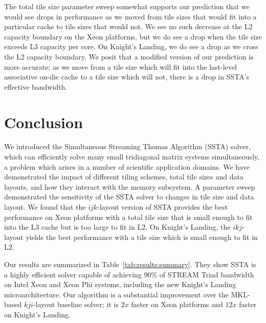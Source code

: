 \documentclass[10pt, conference, compsocconf]{IEEEtran}
\newcommand{\textapprox}{\texttildelow}
\begin{document}
The total tile size parameter sweep somewhat supports our prediction that we
  would see drops in performance as we moved from tile sizes that would
  fit into a particular cache to tile sizes that would not.
We see no such decrease at the L2 capacity boundary on the Xeon platforms, but
  we do see a drop when the tile size exceeds L3 capacity per core.
On Knight's Landing, we do see a drop as we cross the L2 capacity boundary.
We posit that a modified version of our prediction is more accurate; as we move
  from a tile size which will fit into the last-level associative on-die cache
  to a tile size which will not, there is a drop in SSTA's effective bandwidth.

\section{Conclusion}
\label{sec:conclusion}


We introduced the Simultaneous Streaming Thomas Algorithm (SSTA) solver, which
  can efficiently solve many small tridiagonal matrix systems simultaneously, a
  problem which arises in a number of scientific application domains.
We have demonstrated the impact of different tiling schemes, total tile sizes
  and data layouts, and how they interact with the memory subsystem.
A parameter sweep demonstrated the sensitivity of the SSTA solver to changes in
  tile size and data layout.
We found that the \(ijk\)-layout version of SSTA provides the best performance
  on Xeon platforms with a total tile size that is small enough to fit into 
  the L3 cache but is too large to fit in L2.
On Knight's Landing, the \(ikj\)-layout yields the best performance with a
  tile size which is small enough to fit in L2.

Our results are summarized in Table~\ref{tab:results:summary}.
They show SSTA is a highly efficient solver capable of achieving 90\%
  of STREAM Triad bandwidth on Intel Xeon and Xeon Phi systems, including the new
  Knight's Landing microarchitecture.
Our algorithm is a substantial improvement over the MKL-based \(kji\)-layout
  baseline solver; it is \textapprox \(2x\) faster on Xeon platforms and
  \textapprox \(12x\) faster on Knight's Landing.
\end{document}
